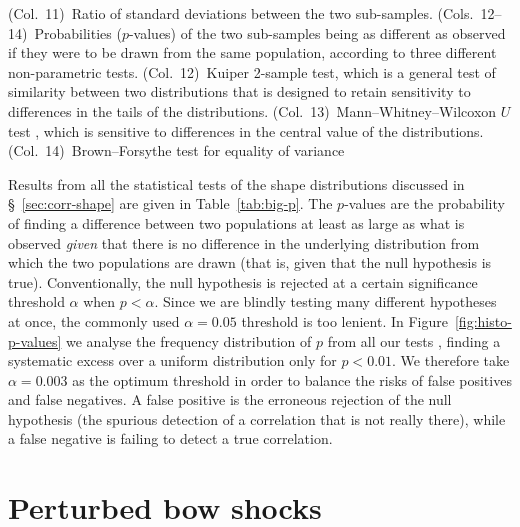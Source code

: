 \documentclass[useAMS, usenatbib, a4paper]{mnras}
\begin{document}
\begin{table}
\begin{tabular}
{  (Col.~11)~Ratio of standard deviations between the two sub-samples.
  (Cols.~12--14)~Probabilities (\(p\)-values) of the two sub-samples being as different as observed if they were to be drawn from the same population, according to three different non-parametric tests.
  (Col.~12)~Kuiper 2-sample test, which is a general test of similarity between two distributions that is designed to retain sensitivity to differences in the tails of the distributions.
  (Col.~13)~Mann--Whitney--Wilcoxon \(U\) test \citep{Mann:1947a}, which is sensitive to differences in the central value of the distributions.
  (Col.~14)~Brown--Forsythe test for equality of variance \citep{Brown:1974a}
}
\end{tabular}
 \end{table}

Results from all the statistical tests of the shape distributions
discussed in \S~\ref{sec:corr-shape} are given in
Table~\ref{tab:big-p}.  The \(p\)-values are the probability of
finding a difference between two populations at least as large as what
is observed \emph{given} that there is no difference in the underlying
distribution from which the two populations are drawn (that is, given
that the null hypothesis is true).  Conventionally, the null
hypothesis is rejected at a certain significance threshold \(\alpha\) when
\(p < \alpha\).  Since we are blindly testing many different hypotheses at
once, the commonly used \(\alpha = 0.05\) threshold is too lenient.  In
Figure~\ref{fig:histo-p-values} we analyse the frequency distribution
of \(p\) from all our tests \citep[see][]{Head:2015a}, finding a
systematic excess over a uniform distribution only for \(p < 0.01\).
We therefore take \(\alpha = 0.003\) as the optimum threshold in order to
balance the risks of false positives and false negatives. A false
positive is the erroneous rejection of the null hypothesis (the
spurious detection of a correlation that is not really there), while a
false negative is failing to detect a true correlation.














\section{Perturbed bow shocks}
\label{sec:perturbed-bows}
\end{document}
